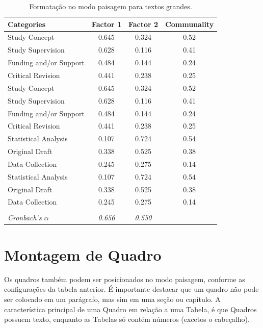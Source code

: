 \begin{landscape}
	\begin{table}[!ht]
		\small
		\centering
		\caption{Formatação no modo paisagem para textos grandes.}
		\label{tab:loadings}
		\begin{tabular*}{\columnwidth}{@{\extracolsep{\fill}}lccc@{}}
			\toprule[1pt]{}\textbf{Categories}      & \textbf{Factor 1} & \textbf{Factor 2} & \textbf{Communality}
			\\\hline
			Study Concept           & 0.645		& 0.324   & 0.52	\\
			Study Supervision		& 0.628		& 0.116   & 0.41	\\
			Funding and/or Support  & 0.484		& 0.144   & 0.24	\\
			Critical Revision   	& 0.441		& 0.238   & 0.25	\\
			Study Concept           & 0.645		& 0.324   & 0.52	\\
			Study Supervision		& 0.628		& 0.116   & 0.41	\\
			Funding and/or Support  & 0.484		& 0.144   & 0.24	\\
			Critical Revision   	& 0.441		& 0.238   & 0.25	\\
			Statistical Analysis 	& 0.107		& 0.724  & 0.54		\\
			Original Draft			& 0.338		& 0.525  & 0.38		\\
			Data Collection			& 0.245   	& 0.275  & 0.14		\\
			Statistical Analysis 	& 0.107		& 0.724  & 0.54		\\
			Original Draft			& 0.338		& 0.525  & 0.38		\\
			Data Collection			& 0.245   	& 0.275  & 0.14		\\
			\hline \\[-1.8ex]
			\textit{Cronbach's $\alpha$}	& \textit{0.656}     & \textit{0.550}  \\
			\bottomrule[1pt]
		\end{tabular*}
	\end{table}
\end{landscape}

\section{Montagem de Quadro}
\label{sec:quadro}
Os quadros também podem ser posicionados no modo paisagem, conforme as configurações da tabela anterior. É importante destacar que um quadro não pode ser colocado em um parágrafo, mas sim em uma seção ou capítulo. A característica principal de uma Quadro em relação a uma Tabela, é que Quadros possuem texto, enquanto as Tabelas só contém números (excetos o cabeçalho).

